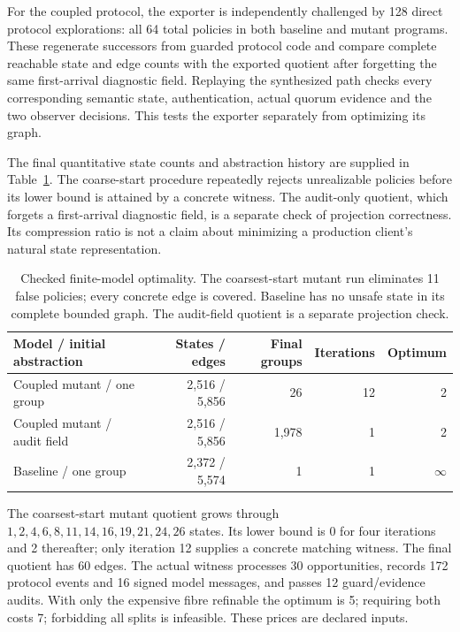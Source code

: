 For the coupled protocol, the exporter is independently challenged by
128 direct protocol explorations: all 64 total policies in both baseline
and mutant programs. These regenerate successors from guarded protocol
code and compare complete reachable state and edge counts with the
exported quotient after forgetting the same first-arrival diagnostic
field. Replaying the synthesized path checks every corresponding
semantic state, authentication, actual quorum evidence and the two
observer decisions. This tests the exporter separately from optimizing
its graph.

The final quantitative state counts and abstraction history are supplied
in Table~\ref{tab:stateful}. The coarse-start procedure repeatedly
rejects unrealizable policies before its lower bound is attained by a
concrete witness. The audit-only quotient, which forgets a first-arrival
diagnostic field, is a separate check of projection correctness. Its
compression ratio is not a claim about minimizing a production client's
natural state representation.

\begin{table}[t]
\centering\small
\begin{tabular}{lrrrr}
\toprule
Model / initial abstraction & States / edges & Final groups & Iterations & Optimum \\
\midrule
Coupled mutant / one group & 2,516 / 5,856 & 26 & 12 & 2 \\
Coupled mutant / audit field & 2,516 / 5,856 & 1,978 & 1 & 2 \\
Baseline / one group & 2,372 / 5,574 & 1 & 1 & $\infty$ \\
\bottomrule
\end{tabular}
\caption{Checked finite-model optimality. The coarsest-start mutant run eliminates 11 false policies; every concrete edge is covered. Baseline has no unsafe state in its complete bounded graph. The audit-field quotient is a separate projection check.}
\label{tab:stateful}
\end{table}

The coarsest-start mutant quotient grows through
\(1,2,4,6,8,11,14,16,19,21,24,26\) states. Its lower bound is 0 for four
iterations and 2 thereafter; only iteration 12 supplies a concrete
matching witness. The final quotient has 60 edges. The actual witness
processes 30 opportunities, records 172 protocol events and 16 signed
model messages, and passes 12 guard/evidence audits. With only the
expensive fibre refinable the optimum is 5; requiring both costs 7;
forbidding all splits is infeasible. These prices are declared inputs.

